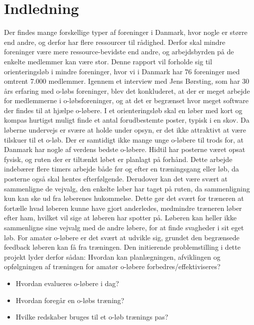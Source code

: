 \chapter{Indledning}
Der findes mange forskellige typer af foreninger i Danmark, hvor nogle er større end andre, og derfor har flere ressourcer til rådighed. Derfor skal mindre foreninger være mere ressource-bevidste end andre, og arbejdsbyrden på de enkelte medlemmer kan være stor.\newline
Denne rapport vil forholde sig til orienteringsløb i mindre foreninger, hvor vi i Danmark har 76 foreninger med omtrent 7.000 medlemmer\citep{DIF}. Igennem et interview med Jens Børsting, som har 30 års erfaring med o-løbs foreninger, blev det konkluderet, at der er meget arbejde for medlemmerne i o-løbsforeninger, og at det er begrænset hvor meget software der findes til at hjælpe o-løbere. \newline
I et orienteringsløb skal en løber med kort og kompas hurtigst muligt finde et antal forudbestemte poster, typisk i en skov. Da løberne undervejs er svære at holde under opsyn, er det ikke attraktivt at være tilskuer til et o-løb. Der er samtidigt ikke mange unge o-løbere til trods for, at Danmark har nogle af verdens bedste o-løbere\citep{RANK}. \newline
Hidtil har posterne været opsat fysisk, og ruten der er tiltænkt løbet er planlagt på forhånd. Dette arbejde indebærer flere timers arbejde både før og efter en træningsgang eller løb, da posterne også skal hentes efterfølgende. Derudover kan det være svært at sammenligne de vejvalg, den enkelte løber har taget på ruten, da sammenligning kun kan ske ud fra løberenes hukommelse. Dette gør det svært for træneren at fortælle hvad løberen kunne have gjort anderledes, medmindre træneren løber efter ham, hvilket vil sige at løberen har spotter på. Løberen kan heller ikke sammenligne sine vejvalg med de andre løbere, for at finde svagheder i sit eget løb.\newline 
For amatør o-løbere er det svært at udvikle sig, grundet den begrænsede feedback løberen kan få fra træningen.\newline
Den initierende problemstilling i dette projekt lyder derfor sådan:\newline
Hvordan kan planlægningen, afviklingen og opfølgningen af træningen for amatør o-løbere forbedres/effektiviseres?
\begin{itemize}
\item Hvordan evalueres o-løbere i dag?
\item Hvordan foregår en o-løbs træning? 
\item Hvilke redskaber bruges til et o-løb trænings pas?
\end{itemize} 





